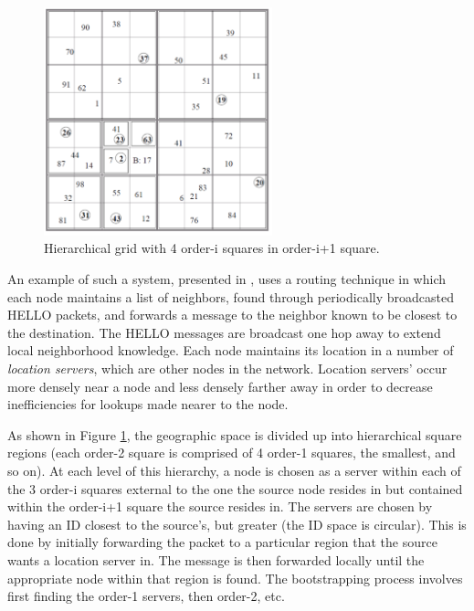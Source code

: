 \documentclass[conference]{IEEEtran}
\newcommand{\colwidth}{2.6in}
\begin{document}
\begin{figure}
\label{fig:location-service}
\centering
\includegraphics[width=\colwidth]{../../images/external/location_routing/location_service.pdf}
\caption{Hierarchical grid with 4 order-i squares in order-i+1 square.}
\end{figure}

An example of such a system, presented in \cite{Li:2000:SLS:345910.345931}, uses a routing technique in which each node maintains a list of neighbors, found through periodically broadcasted HELLO packets, and forwards a message to the neighbor known to be closest to the destination.
The HELLO messages are broadcast one hop away to extend local neighborhood knowledge.
Each node maintains its location in a number of \emph{location servers}, which are other nodes in the network.
Location servers' occur more densely near a node and less densely farther away in order to decrease inefficiencies for lookups made nearer to the node.

As shown in Figure \ref{fig:location-service}, the geographic space is divided up into hierarchical square regions (each order-2 square is comprised of 4 order-1 squares, the smallest, and so on).
At each level of this hierarchy, a node is chosen as a server within each of the 3 order-i squares external to the one the source node resides in but contained within the order-i+1 square the source resides in. 
The servers are chosen by having an ID closest to the source's, but greater (the ID space is circular).
This is done by initially forwarding the packet to a particular region that the source wants a location server in.
The message is then forwarded locally until the appropriate node within that region is found.
The bootstrapping process involves first finding the order-1 servers, then order-2, etc.
\end{document}

